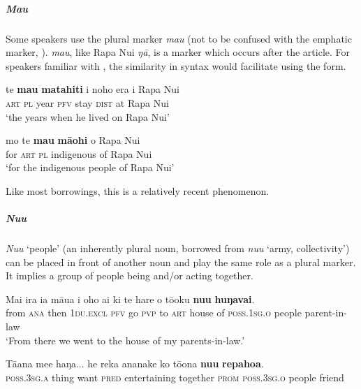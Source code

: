 \subparagraph{\textit{Mau}} Some speakers use the  plural marker \textit{mau} (not to be confused with the emphatic marker, ).  \textit{mau}, like Rapa Nui \textit{ŋā}, is a marker which occurs after the article. For speakers familiar with , the similarity in syntax would facilitate using the  form.

\ea\label{ex:5.93}
\gll te \textbf{mau} \textbf{matahiti} i noho era {\ꞌ}i Rapa Nui \\
\textsc{art} \textsc{pl} year \textsc{pfv} stay \textsc{dist} at Rapa Nui \\

\glt 
‘the years when he lived on Rapa Nui’ \textstyleExampleref{[R231.306]} 
\z	

\ea\label{ex:5.94}
\gll mo te \textbf{mau} \textbf{mā{\ꞌ}ohi} o Rapa Nui\\
for \textsc{art} \textsc{pl} indigenous of Rapa Nui\\

\glt
‘for the indigenous people of Rapa Nui’ 
\z

Like most  borrowings, this is a relatively recent phenomenon. 

\subparagraph{\textit{Nu{\ꞌ}u}} \textit{Nu{\ꞌ}u} ‘people’ (an inherently plural noun, borrowed from  \textit{\mbox{nu{\ꞌ}u}} ‘army, collectivity’) can be placed in front of another noun and play the same role as a plural marker. It implies a group of people being and/or acting together.

\ea\label{ex:5.95}
\gll Mai ira ia māua i oho ai ki te hare o tō{\ꞌ}oku \textbf{nu{\ꞌ}u} \textbf{huŋavai}. \\
from \textsc{ana} then \textsc{1du.excl} \textsc{pfv} go \textsc{pvp} to \textsc{art} house of \textsc{poss.1sg.o} people parent\nobreakdash-in\nobreakdash-law \\

\glt 
‘From there we went to the house of my parents-in-law.’ \textstyleExampleref{[R107.018]} 
\z

\ea\label{ex:5.96}
\gll Tā{\ꞌ}ana me{\ꞌ}e haŋa... he reka ananake ko tō{\ꞌ}ona \textbf{nu{\ꞌ}u} \textbf{repahoa}.\\
\textsc{poss.3sg.a} thing want \textsc{pred} entertaining together \textsc{prom} \textsc{poss.3sg.o} people friend\\

